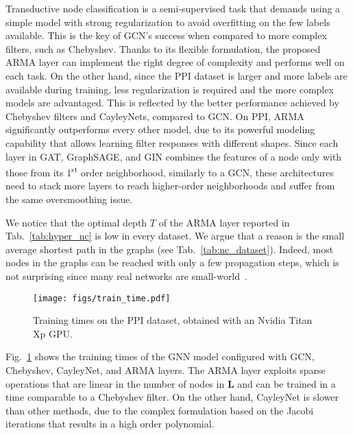 \documentclass{article}
\def\L{{\mathbf L}}
\def\L{{\mathbf L}}
\begin{document}
Transductive node classification is a semi-supervised task that demands using a simple model with strong regularization to avoid overfitting on the few labels available.
This is the key of GCN's success when compared to more complex filters, such as Chebyshev.
Thanks to its flexible formulation, the proposed ARMA layer can implement the right degree of complexity and performs well on each task. 
On the other hand, since the PPI dataset is larger and more labels are available during training, less regularization is required and the more complex models are advantaged. 
This is reflected by the better performance achieved by Chebyshev filters and CayleyNets, compared to GCN.
On PPI, ARMA significantly outperforms every other model, due to its powerful modeling capability that allows learning filter responses with different shapes.
Since each layer in GAT, GraphSAGE, and GIN combines the features of a node only with those from its 1\textsuperscript{st} order neighborhood, similarly to a GCN, these architectures need to stack more layers to reach higher-order neighborhoods and suffer from the same oversmoothing issue.

We notice that the optimal depth $T$ of the ARMA layer reported in Tab.~\ref{tab:hyper_nc} is low in every dataset.
We argue that a reason is the small average shortest path in the graphs (see Tab.~\ref{tab:nc_dataset}).
Indeed, most nodes in the graphs can be reached with only a few propagation steps, which is not surprising since many real networks are small-world~\cite{watts1998collective}.

\begin{figure}[!ht]
	\centering
	\caption{Training times on the PPI dataset, obtained with an Nvidia Titan Xp GPU.}
	\texttt{[image: figs/train\_time.pdf]}	
	\label{fig:train_time}
\end{figure}

Fig.~\ref{fig:train_time} shows the training times of the GNN model configured with GCN, Chebyshev, CayleyNet, and ARMA layers. 
The ARMA layer exploits sparse operations that are linear in the number of nodes in $\L$ and can be trained in a time comparable to a Chebyshev filter.
On the other hand, CayleyNet is slower than other methods, due to the complex formulation based on the Jacobi iterations that results in a high order polynomial. 
\end{document}
